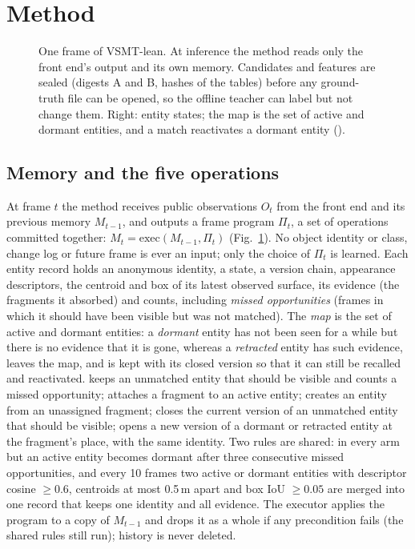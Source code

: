 \section{Method}
\label{sec:method}

\begin{figure}[t]
\centering

\caption{One frame of VSMT-lean. At inference the method reads only the front end's output and its own memory. Candidates and features are sealed (digests A and B, hashes of the tables) before any ground-truth file can be opened, so the offline teacher can label but not change them. Right: entity states; the map is the set of active and dormant entities, and a match reactivates a dormant entity ().}
\label{fig:method}
\end{figure}

\subsection{Memory and the five operations}
At frame $t$ the method receives public observations $O_t$ from the front end and its previous memory $M_{t-1}$, and outputs a frame program $\Pi_t$, a set of operations committed together: $M_t=\mathrm{exec}(M_{t-1},\Pi_t)$ (Fig.~\ref{fig:method}).
No object identity or class, change log or future frame is ever an input; only the choice of $\Pi_t$ is learned.
Each entity record holds an anonymous identity, a state, a version chain, appearance descriptors, the centroid and box of its latest observed surface, its evidence (the fragments it absorbed) and counts, including \emph{missed opportunities} (frames in which it should have been visible but was not matched).
The \emph{map} is the set of active and dormant entities: a \emph{dormant} entity has not been seen for a while but there is no evidence that it is gone, whereas a \emph{retracted} entity has such evidence, leaves the map, and is kept with its closed version so that it can still be recalled and reactivated.
 keeps an unmatched entity that should be visible and counts a missed opportunity;  attaches a fragment to an active entity;  creates an entity from an unassigned fragment;  closes the current version of an unmatched entity that should be visible;  opens a new version of a dormant or retracted entity at the fragment's place, with the same identity.
Two rules are shared: in every arm but  an active entity becomes dormant after three consecutive missed opportunities, and every 10 frames two active or dormant entities with descriptor cosine $\geq 0.6$, centroids at most 0.5\,m apart and box IoU $\geq 0.05$ are merged into one record that keeps one identity and all evidence.
The executor applies the program to a copy of $M_{t-1}$ and drops it as a whole if any precondition fails (the shared rules still run); history is never deleted.

